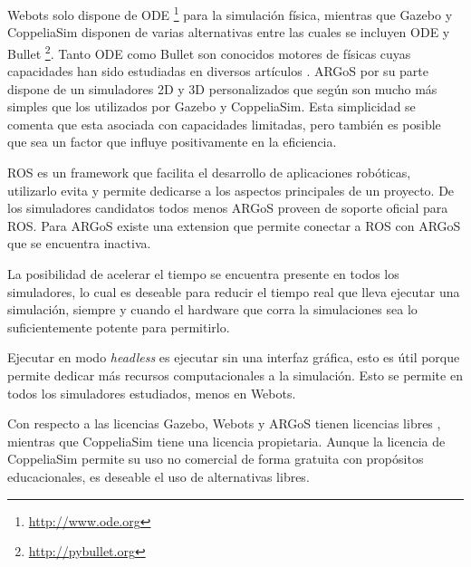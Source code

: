 Webots solo dispone de ODE \footnote{\url{http://www.ode.org}} para la simulación física,
mientras que Gazebo y CoppeliaSim disponen de varias alternativas entre las
cuales se incluyen ODE y Bullet \footnote{\url{http://pybullet.org}}. Tanto ODE como Bullet son conocidos
motores de físicas cuyas capacidades han sido estudiadas en diversos artículos
\cite{bzhikhatlov2017research,erez2015simulation,ronnau2013evaluation}.
ARGoS por su parte dispone de un simuladores 2D y 3D personalizados que según
\cite{Pitonakova2018} son mucho más simples que los utilizados por Gazebo y
CoppeliaSim. Esta simplicidad se comenta que esta asociada con capacidades
limitadas, pero también es posible que sea un factor que influye positivamente
en la eficiencia.


\gls{ROS} \cite{ros} es un framework que facilita el desarrollo de aplicaciones
robóticas, utilizarlo evita  y permite dedicarse
a los aspectos principales de un proyecto. 
De los simuladores candidatos
todos menos ARGoS proveen de soporte oficial para \gls{ROS}. Para ARGoS existe una
extension \cite{argos_bridge} que permite conectar a \gls{ROS} con ARGoS que se
encuentra inactiva. %


La posibilidad de acelerar el tiempo se encuentra presente en todos los
simuladores, lo cual es deseable para reducir el tiempo real que lleva ejecutar
una simulación, siempre y cuando el hardware que corra la simulaciones sea lo
suficientemente potente para permitirlo. 

Ejecutar en modo \emph{headless} es ejecutar sin una interfaz gráfica, esto es
útil porque permite dedicar más recursos computacionales a la simulación.
Esto se permite en todos los simuladores estudiados, menos en Webots.

Con respecto a las licencias Gazebo, Webots y ARGoS tienen licencias
libres \cite{fsf}, mientras que CoppeliaSim tiene una licencia propietaria.
Aunque la licencia de CoppeliaSim permite su uso no comercial de forma gratuita
con propósitos educacionales, es deseable el uso de alternativas libres.

